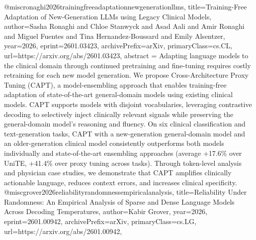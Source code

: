{}@misc{ronaghi2026trainingfreeadaptationnewgenerationllms,
      title={Training-Free Adaptation of New-Generation LLMs using Legacy Clinical Models}, 
      author={Sasha Ronaghi and Chloe Stanwyck and Asad Aali and Amir Ronaghi and Miguel Fuentes and Tina Hernandez-Boussard and Emily Alsentzer},
      year={2026},
      eprint={2601.03423},
      archivePrefix={arXiv},
      primaryClass={cs.CL},
      url={https://arxiv.org/abs/2601.03423},
      abstract = {Adapting language models to the clinical domain through continued pretraining and fine-tuning requires costly retraining for each new model generation. We propose Cross-Architecture Proxy Tuning (CAPT), a model-ensembling approach that enables training-free adaptation of state-of-the-art general-domain models using existing clinical models. CAPT supports models with disjoint vocabularies, leveraging contrastive decoding to selectively inject clinically relevant signals while preserving the general-domain model's reasoning and fluency. On six clinical classification and text-generation tasks, CAPT with a new-generation general-domain model and an older-generation clinical model consistently outperforms both models individually and state-of-the-art ensembling approaches (average +17.6\% over UniTE, +41.4\% over proxy tuning across tasks). Through token-level analysis and physician case studies, we demonstrate that CAPT amplifies clinically actionable language, reduces context errors, and increases clinical specificity.}
}@misc{grover2026reliabilityrandomnessempiricalanalysis,
      title={Reliability Under Randomness: An Empirical Analysis of Sparse and Dense Language Models Across Decoding Temperatures}, 
      author={Kabir Grover},
      year={2026},
      eprint={2601.00942},
      archivePrefix={arXiv},
      primaryClass={cs.LG},
      url={https://arxiv.org/abs/2601.00942},
}
